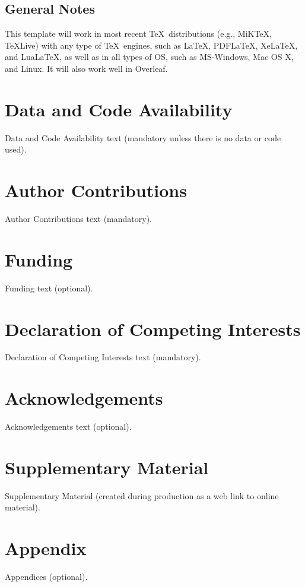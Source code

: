 \documentclass[]{imag-ms-template}
\begin{document}
\subsection*{General Notes}

\noindent This template will work in most recent \TeX\ distributions
(e.g., MiKTeX, TeXLive) with any type of \TeX\ engines, such as
\LaTeX, PDF\LaTeX, Xe\LaTeX, and Lua\LaTeX, as well as in all types of OS, such
as MS-Windows, Mac OS X, and Linux. It will also work well in Overleaf.

\section*{Data and Code Availability}

Data and Code Availability text (mandatory unless there is no data or code used).

\section*{Author Contributions}

Author Contributions text (mandatory).

\section*{Funding}

Funding text (optional).

\section*{Declaration of Competing Interests}

Declaration of Competing Interests text (mandatory).

\section*{Acknowledgements}

Acknowledgements text (optional).

\section*{Supplementary Material}

Supplementary Material (created during production as a web link to online material).

\printbibliography

\appendix

\section{Appendix}

Appendices (optional).
\end{document}
